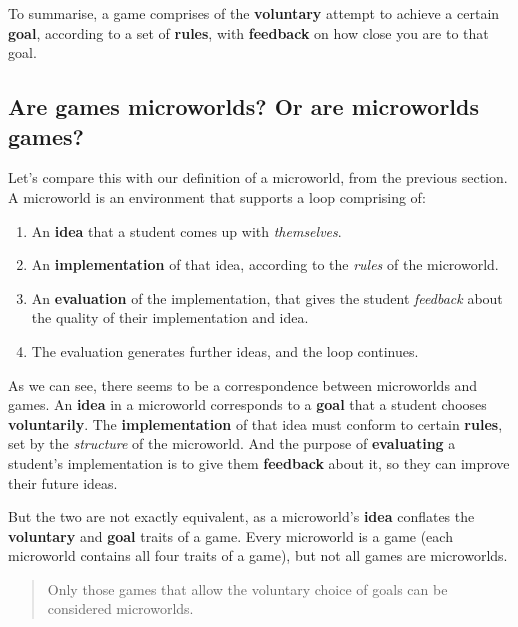 To summarise, a game comprises of the \textbf{voluntary} attempt to
achieve a certain \textbf{goal}, according to a set of \textbf{rules},
with \textbf{feedback} on how close you are to that goal.

\subsection{Are games microworlds? Or are microworlds games?}

Let's compare this with our definition of a microworld, from the
previous section. A microworld is an environment that supports a loop
comprising of:

\begin{enumerate}

\item
  An \textbf{idea} that a student comes up with \emph{themselves}.

\item
  An \textbf{implementation} of that idea, according to the \emph{rules}
  of the microworld.

\item
  An \textbf{evaluation} of the implementation, that gives the student
  \emph{feedback} about the quality of their implementation and idea.

\item
  The evaluation generates further ideas, and the loop continues.

\end{enumerate}

As we can see, there seems to be a correspondence between microworlds and
games. An \textbf{idea} in a microworld corresponds to a \textbf{goal}
that a student chooses \textbf{voluntarily}. The \textbf{implementation}
of that idea must conform to certain \textbf{rules}, set by the
\emph{structure} of the microworld. And the purpose of
\textbf{evaluating} a student's implementation is to give them
\textbf{feedback} about it, so they can improve their future ideas.

But the two are not exactly equivalent, as a microworld's \textbf{idea}
conflates the \textbf{voluntary} and \textbf{goal} traits of a game.
Every microworld is a game (each microworld contains all four traits of
a game), but not all games are microworlds.

\begin{quote}
Only those games that allow the voluntary choice of goals can be
considered microworlds.
\end{quote}


